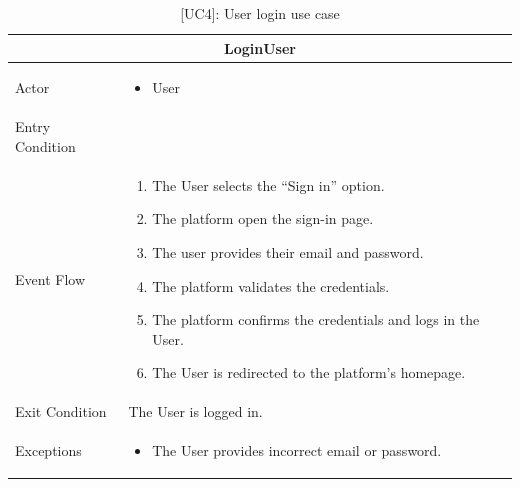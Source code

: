 \begin{table}[H]
    \centering
    \begin{tabular}{|p{3cm}|p{12cm}|}
    \hline
    \multicolumn{2}{|c|}{\textbf{LoginUser}} \\ \hline
    Actor & 
    \begin{itemize}
        \item User
    \end{itemize}\\ \hline
    Entry Condition & \\ \hline
    Event Flow &
    \begin{enumerate}         
        \item The User selects the “Sign in” option.
        \item The platform open the sign-in page.
        \item The user provides their email and password.
        \item The platform validates the credentials.
        \item The platform confirms the credentials and logs in the User.
        \item The User is redirected to the platform's homepage.
    \end{enumerate} \\ \hline
    Exit Condition & The User is logged in. \\ \hline
    Exceptions &
    \begin{itemize}
        \item The User provides incorrect email or password.
    \end{itemize} \\ \hline
    \end{tabular}
    \caption{[UC4]: User login use case}
    \label{tab:UC4}
\end{table}

